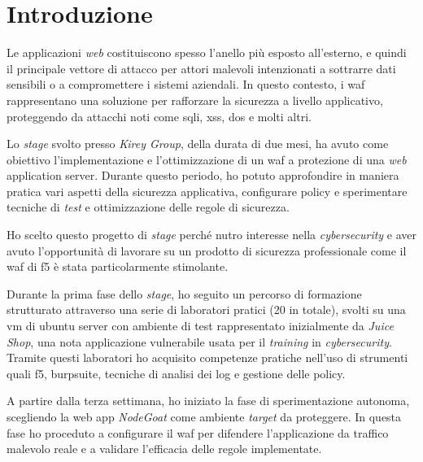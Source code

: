 %     
%     
%     

\chapter{Introduzione}
\label{cap:1introduzione}

Le applicazioni \emph{web} costituiscono spesso l'anello più esposto all'esterno, e quindi il principale vettore di attacco per attori malevoli intenzionati a sottrarre dati sensibili o a compromettere i sistemi aziendali. In questo contesto, i \gls{waf} rappresentano una soluzione per rafforzare la sicurezza a livello applicativo, proteggendo da attacchi noti come \gls{sqli}, \gls{xss}, \gls{dos} e molti altri.

Lo \emph{stage} svolto presso \emph{Kirey Group}, della durata di due mesi, ha avuto come obiettivo l'implementazione e l'ottimizzazione di un \gls{waf} a protezione di una \emph{web} application server. Durante questo periodo, ho potuto approfondire in maniera pratica vari aspetti della sicurezza applicativa, configurare \gls{policy} e sperimentare tecniche di \emph{test} e ottimizzazione delle regole di sicurezza.

Ho scelto questo progetto di \emph{stage} perché nutro interesse nella \emph{cybersecurity} e aver avuto l'opportunità di lavorare su un prodotto di sicurezza professionale come il \gls{waf} di \gls{f5} è stata particolarmente stimolante.

Durante la prima fase dello \emph{stage}, ho seguito un percorso di formazione strutturato attraverso una serie di laboratori pratici (20 in totale), svolti su una \gls{vm} di \gls{ubuntu} server con ambiente di test rappresentato inizialmente da \emph{Juice Shop}, una nota applicazione vulnerabile usata per il \emph{training} in \emph{cybersecurity}. Tramite questi laboratori ho acquisito competenze pratiche nell'uso di strumenti quali \gls{f5}, \gls{burpsuite}, tecniche di analisi dei \gls{log} e gestione delle \gls{policy}.

A partire dalla terza settimana, ho iniziato la fase di sperimentazione autonoma, scegliendo la web app \emph{NodeGoat} come ambiente \emph{target} da proteggere. In questa fase ho proceduto a configurare il \gls{waf} per difendere l'applicazione da traffico malevolo reale e a validare l'efficacia delle regole implementate.


